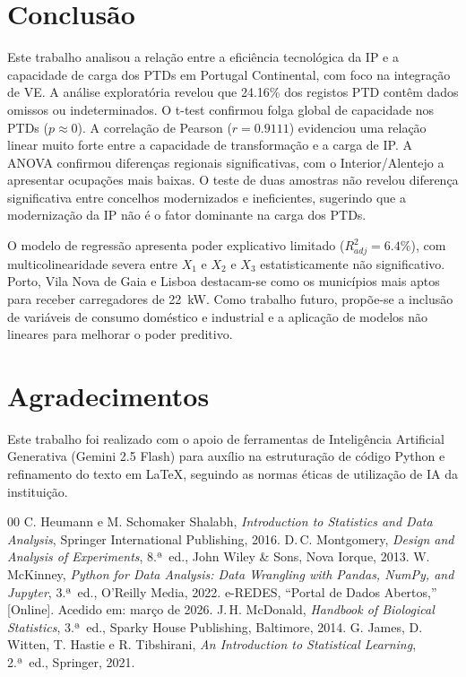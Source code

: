 \documentclass[conference]{IEEEtran}
\begin{document}
\section{Conclusão}

Este trabalho analisou a relação entre a eficiência tecnológica da IP e a capacidade de carga dos PTDs em Portugal Continental, com foco na integração de VE. A análise exploratória revelou que 24.16\% dos registos PTD contêm dados omissos ou indeterminados. O t-test confirmou folga global de capacidade nos PTDs ($p \approx 0$). A correlação de Pearson ($r = 0.9111$) evidenciou uma relação linear muito forte entre a capacidade de transformação e a carga de IP. A ANOVA confirmou diferenças regionais significativas, com o Interior/Alentejo a apresentar ocupações mais baixas. O teste de duas amostras não revelou diferença significativa entre concelhos modernizados e ineficientes, sugerindo que a modernização da IP não é o fator dominante na carga dos PTDs.

O modelo de regressão apresenta poder explicativo limitado ($R^2_{adj} = 6.4\%$), com multicolinearidade severa entre $X_1$ e $X_2$ e $X_3$ estatisticamente não significativo. Porto, Vila Nova de Gaia e Lisboa destacam-se como os municípios mais aptos para receber carregadores de 22~kW. Como trabalho futuro, propõe-se a inclusão de variáveis de consumo doméstico e industrial e a aplicação de modelos não lineares para melhorar o poder preditivo.

\section*{Agradecimentos}

Este trabalho foi realizado com o apoio de ferramentas de Inteligência Artificial Generativa (Gemini 2.5 Flash) para auxílio na estruturação de código Python e refinamento do texto em \LaTeX, seguindo as normas éticas de utilização de IA da instituição.


\begin{thebibliography}{00}
 C. Heumann e M. Schomaker Shalabh, \textit{Introduction to Statistics and Data Analysis},
Springer International Publishing, 2016.
 D.\,C. Montgomery, \textit{Design and Analysis of Experiments}, 8.ª~ed.,
John Wiley \& Sons, Nova Iorque, 2013.
 W. McKinney, \textit{Python for Data Analysis: Data Wrangling with Pandas, NumPy, and Jupyter},
3.ª~ed., O'Reilly Media, 2022.
 e-REDES, ``Portal de Dados Abertos,'' [Online].
Acedido em: março de 2026.
 J.\,H. McDonald, \textit{Handbook of Biological Statistics}, 3.ª~ed.,
Sparky House Publishing, Baltimore, 2014.
 G. James, D. Witten, T. Hastie e R. Tibshirani,
\textit{An Introduction to Statistical Learning}, 2.ª~ed., Springer, 2021.
\end{thebibliography}
\end{document}
